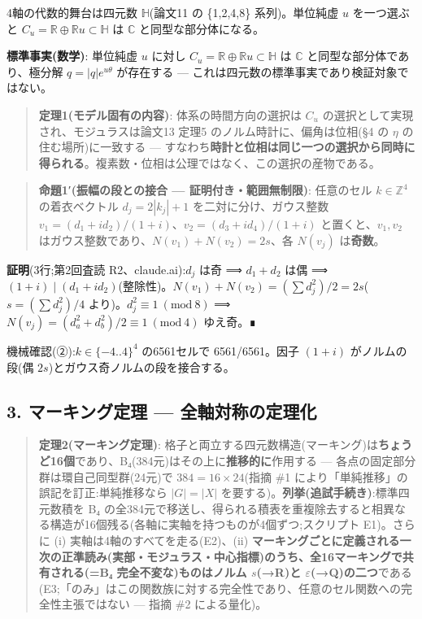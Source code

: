 \documentclass[
]{ltjsarticle}
\begin{document}
4軸の代数的舞台は四元数 \(\mathbb{H}\)(論文11 の \{1,2,4,8\}
系列)。単位純虚 \(u\) を一つ選ぶと
\(C_u=\mathbb{R}\oplus\mathbb{R}u\subset\mathbb{H}\) は \(\mathbb{C}\)
と同型な部分体になる。

\textbf{標準事実(数学)}: 単位純虚 \(u\) に対し
\(C_u=\mathbb{R}\oplus\mathbb{R}u\subset\mathbb{H}\) は \(\mathbb{C}\)
と同型な部分体であり、極分解 \(q=|q|e^{u\theta}\) が存在する ---
これは四元数の標準事実であり検証対象ではない。

\begin{quote}
\textbf{定理1(モデル固有の内容)}: 体系の時間方向の選択は \(C_u\)
の選択として実現され、モジュラスは論文13 定理5
のノルム時計に、偏角は位相(§4 の \(\eta\) の住む場所)に一致する ---
すなわち\textbf{時計と位相は同じ一つの選択から同時に得られる}。複素数・位相は公理ではなく、この選択の産物である。
\end{quote}

\begin{quote}
\textbf{命題1′(振幅の段との接合 --- 証明付き・範囲無制限)}: 任意のセル
\(k\in\mathbb{Z}^4\) の着衣ベクトル \(d_j=2|k_j|+1\)
を二対に分け、ガウス整数
\(v_1=(d_1+id_2)/(1+i)\)、\(v_2=(d_3+id_4)/(1+i)\) と置くと、\(v_1,v_2\)
はガウス整数であり、\(N(v_1)+N(v_2)=2s\)、各 \(N(v_j)\)
は\textbf{奇数}。
\end{quote}

\textbf{証明}(3行;第2回査読 R2、claude.ai):\(d_j\) は奇 ⟹ \(d_1+d_2\)
は偶 ⟹
\((1+i)\mid(d_1+id_2)\)(整除性)。\(N(v_1)+N(v_2)=(\sum d_j^2)/2=2s\)(\(s=(\sum d_j^2)/4\)
より)。\(d_j^2\equiv1\ (\mathrm{mod}\ 8)\) ⟹
\(N(v_j)=(d_a^2+d_b^2)/2\equiv1\ (\mathrm{mod}\ 4)\) ゆえ奇。∎

機械確認(②):\(k\in\{-4..4\}^4\) の6561セルで 6561/6561。因子 \((1+i)\)
がノルムの段(偶 \(2s\))とガウス奇ノルムの段を接合する。

\subsection{3. マーキング定理 ---
全軸対称の定理化}\label{ux30deux30fcux30adux30f3ux30b0ux5b9aux7406-ux5168ux8ef8ux5bfeux79f0ux306eux5b9aux7406ux5316}

\begin{quote}
\textbf{定理2(マーキング定理)}:
格子と両立する四元数構造(マーキング)は\textbf{ちょうど16個}であり、B₄(384元)はその上に\textbf{推移的に}作用する
--- 各点の固定部分群は環自己同型群(24元)で \(384=16\times24\)(指摘 \#1
により「単純推移」の誤記を訂正:単純推移なら \(|G|=|X|\)
を要する)。\textbf{列挙(追試手続き)}:標準四元数積を B₄
の全384元で移送し、得られる積表を重複除去すると相異なる構造が16個残る(各軸に実軸を持つものが4個ずつ;スクリプト
E1)。さらに (i) 実軸は4軸のすべてを走る(E2)、(ii)
\textbf{マーキングごとに定義される一次の正準読み(実部・モジュラス・中心指標)のうち、全16マーキングで共有される(=B₄
完全不変な)ものはノルム \(s\)(→R)と
\(\varepsilon\)(→Q)の二つ}である(E3;「のみ」はこの関数族に対する完全性であり、任意のセル関数への完全性主張ではない
--- 指摘 \#2 による量化)。
\end{quote}
\end{document}
